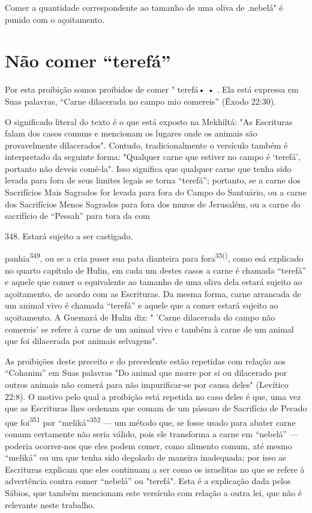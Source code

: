 Comer a quantidade correspondente ao tamanho de uma oliva de
.nebelá" é punido com o açoitamento.

\section{Não comer ``terefá''}

Por esta proibição somos proibidos de comer " terefá• • . Ela está
ex­pressa em Suas palavras, ``Carne dilacerada no campo mio comereis''
(Êxodo 22:30).

O significado literal do texto é o que está exposto na Mekhiltá: "As
Escrituras falam dos casos comuns e mencionam os lugares onde os
ani­mais são provavelmente dilacerados". Contudo, tradicionalmente o
versículo também é interpretado da seguinte forma: "Qualquer carne que
estiver no campo é `terefá', portanto não deveis comê-la". Isso
significa que qualquer carne que tenha sido levada para fora de seus
limites legais se torna ``terefá''; portanto, se a carne dos Sacrifícios
Mais Sagrados for levada para fora do Cam­po do Santuário, ou a carne
dos Sacrifícios Menos Sagrados para fora dos mu­ros de Jerusalém, ou a
carne do sacrifício de ``Pessah'' para tora da com

348. Estará sujeito a ser castigado.

panhia\textsuperscript{349}, ou se a cria puser sua pata dianteira para
fora\textsuperscript{35()}, como esá explica­do no quarto capítulo de
Hulin, em cada um destes casos a carne é chamada ``terefá'' e aquele que
comer o equivalente ao tamanho de uma oliva dela estará sujeito ao
açoitamento, de acordo com as Escrituras. Da mesma forma, carne
arrancada de um animal vivo é chamada ``terefá'' e aquele que a comer
estará sujeito ao açoitamento. A Guemará de Hulin diz: " 'Carne
dilacerada do campo não comereis' se refere à carne de um animal vivo e
também à carne de um animal que foi dilacerada por animais selvagens".

As proibições deste preceito e do precedente estão repetidas com relação
aos ``Cohanim'' em Suas palavras "Do animal que morre por si ou
dila­cerado por outros animais não comerá para não impurificar-se por
causa de­les" (Levítico 22:8). O motivo pelo qual a proibição está
repetida no caso deles é que, uma vez que as Escrituras lhes ordenam que
comam de um pássaro de Sacrifício de Pecado que foi\textsuperscript{351}
por ``meliká''\textsuperscript{352} --- um método que, se fosse usado para
abater carne comum certamente não seria válido, pois ele transfor­ma a
carne em ``nebelá'' --- poderia ocorrer-nos que eles podem comer, como
alimento comum, até mesmo ``meliká'' ou um que tenha sido degolado de
ma­neira inadequada; por isso as Escrituras explicam que eles continuam
a ser co­mo os israelitas no que se refere à advertência contra comer
``nebelá'' ou "tere­fá". Esta é a explicação dada pelos Sábios, que também
mencionam este versí­culo com relação a outra lei, que não é relevante
neste trabalho.

